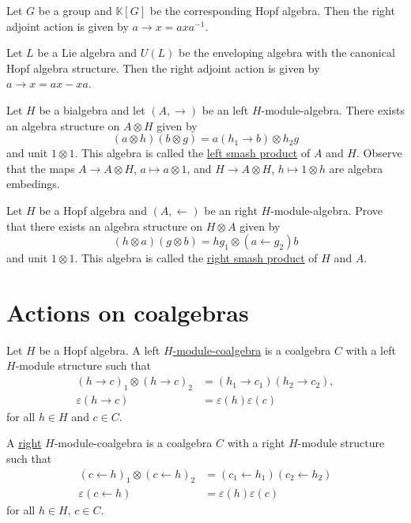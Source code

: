 Let $G$ be a group and $\mathbb{K}[G]$ be the corresponding Hopf algebra. Then
the right adjoint action is given by $a\rightarrow x=axa^{-1}$.

\begin{example}
Let $L$ be a Lie algebra and $U(L)$ be the enveloping algebra with
the canonical Hopf algebra structure. Then the right adjoint action
is given by $a\rightarrow x=ax-xa$.
\end{example}

\begin{exercise}
\label{exercise:left_smash}
Let $H$ be a bialgebra and let $(A,\rightarrow)$ be an left $H$-module-algebra.
There exists an algebra structure on $A\otimes H$ given by
\[
(a\otimes h)(b\otimes g)=a(h_{1}\rightarrow b)\otimes h_{2}g
\]
and unit $1\otimes1$. This algebra is called the \underline{left smash product}
of $A$ and $H$.  Observe that the maps $A\to A\otimes H$, $a\mapsto a\otimes1$,
and $H\to A\otimes H$, $h\mapsto 1\otimes h$ are algebra embedings.
\end{exercise}

\begin{exercise}
Let $H$ be a Hopf algebra and $(A,\leftarrow)$ be an right $H$-module-algebra.
Prove that there exists an algebra structure on $H\otimes A$ given by 
\[
(h\otimes a)(g\otimes b)=hg_{1}\otimes(a\leftarrow g_{2})b
\]
and unit $1\otimes1$. This algebra is called the \underline{right
smash product} of $H$ and $A$. 
\end{exercise}

\section{Actions on coalgebras}

\begin{definition}
\label{def:module_coalgebra}
Let $H$ be a Hopf algebra. A left \underline{$H$-module-coalgebra}
is a coalgebra $C$ with a left $H$-module structure such that 
\begin{align*}
(h\rightarrow c)_{1}\otimes(h\rightarrow c)_{2} & =(h_{1}\rightarrow c_{1})(h_{2}\rightarrow c_{2}),\\
\varepsilon(h\rightarrow c) & =\varepsilon(h)\varepsilon(c)
\end{align*}
for all $h\in H$ and $c\in C$. 
\end{definition}

A \underline{right} $H$-module-coalgebra is a coalgebra $C$ with a right
$H$-module structure such that 
\begin{align*}
(c\leftarrow h)_{1}\otimes(c\leftarrow h)_{2} & =(c_{1}\leftarrow h_{1})(c_{2}\leftarrow h_{2})\\
\varepsilon(c\leftarrow h) & =\varepsilon(h)\varepsilon(c)
\end{align*}
for all $h\in H$, $c\in C$.

